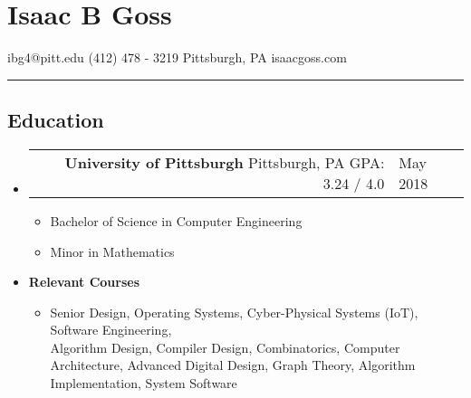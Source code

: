 \documentclass[18pt]{article}
\makeatletter
\providecommand{\tightlist}{
    \setlength{\itemsep}{0pt}\setlength{\parskip}{0pt}
}
\providecommand{\datetable}[2]{
    \begin{tabular*}{\textwidth}{@{}r @{\extracolsep{\fill}} l}
        #1 & #2
    \end{tabular*}
}
\makeatother
\begin{document}
  \section*{Isaac B Goss}\label{isaac-b-goss}
    ibg4@pitt.edu \textbar{} (412) 478 - 3219 \textbar{} Pittsburgh, PA \textbar{} isaacgoss.com
    
    \hrule
    
    \subsection*{Education}\label{education}
        \begin{itemize}[label={}]
        \item \datetable{
            \textbf{University of Pittsburgh} \textbar{} 
            Pittsburgh, PA \textbar{} 
            GPA: 3.24 / 4.0
        }{
            May 2018
        }
        \begin{itemize}[ topsep=0pt]\tightlist
          \item Bachelor of Science in Computer Engineering
          \item Minor in Mathematics
        \end{itemize}
        \item \textbf{Relevant Courses}
            \begin{itemize}[label={}, topsep=0pt]
                \item
                Senior Design,
                Operating Systems,
                Cyber-Physical Systems (IoT),
                Software Engineering,\\
                Algorithm Design,
                Compiler Design,
                Combinatorics,
                Computer Architecture,
                Advanced Digital Design,
                Graph Theory,
                Algorithm Implementation,
                System Software
            \end{itemize}
        \end{itemize}
    
\end{document}
